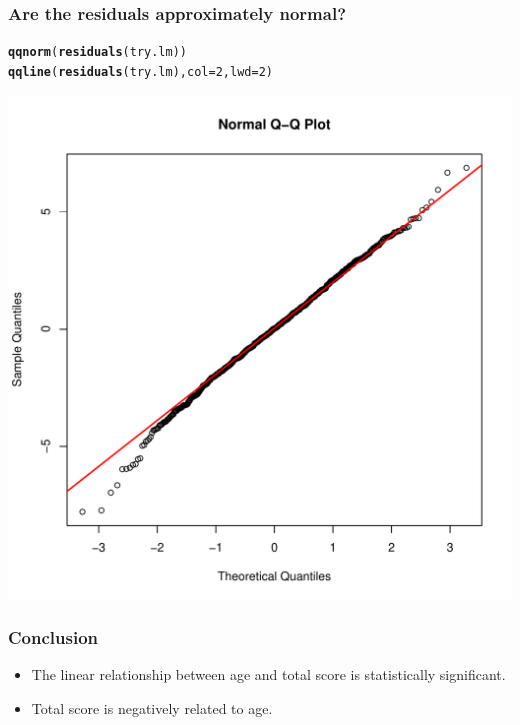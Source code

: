 \documentclass{beamer}\usepackage[]{graphicx}\usepackage[]{color}
\makeatletter
\newcommand{\hlnum}[1]{\textcolor[rgb]{0.686,0.059,0.569}{#1}}%
\newcommand{\hlstd}[1]{\textcolor[rgb]{0.345,0.345,0.345}{#1}}%
\newcommand{\hlkwc}[1]{\textcolor[rgb]{0.333,0.667,0.333}{#1}}%
\newcommand{\hlkwd}[1]{\textcolor[rgb]{0.737,0.353,0.396}{\textbf{#1}}}%
\newenvironment{kframe}{%
 \def\at@end@of@kframe{}%
 \ifinner\ifhmode%
  \def\at@end@of@kframe{\end{minipage}}%
  \begin{minipage}{\columnwidth}%
 \fi\fi%
 \def\FrameCommand##1{\hskip\@totalleftmargin \hskip-\fboxsep
 \colorbox{shadecolor}{##1}\hskip-\fboxsep
     \hskip-\linewidth \hskip-\@totalleftmargin \hskip\columnwidth}%
 \MakeFramed {\advance\hsize-\width
   \@totalleftmargin\z@ \linewidth\hsize
   \@setminipage}}%
 {\par\unskip\endMakeFramed%
 \at@end@of@kframe}
\newenvironment{knitrout}{}{} %
\makeatother
\begin{document}
\begin{frame}[fragile]
\frametitle{Are the residuals approximately normal?}
\begin{knitrout}
\color{fgcolor}\begin{kframe}
\begin{alltt}
\hlkwd{qqnorm}\hlstd{(}\hlkwd{residuals}\hlstd{(try.lm))}
\hlkwd{qqline}\hlstd{(}\hlkwd{residuals}\hlstd{(try.lm),} \hlkwc{col} \hlstd{=} \hlnum{2}\hlstd{,} \hlkwc{lwd} \hlstd{=} \hlnum{2}\hlstd{)}
\end{alltt}
\end{kframe}

{\centering \includegraphics[width=0.6\linewidth]{figure/unnamed-chunk-7-1} 

}



\end{knitrout}
\end{frame} 


\begin{frame}[fragile]
\frametitle{Conclusion}
\begin{itemize}
\item The linear relationship between age and total score is statistically significant.
\item Total score is negatively related to age.
\end{itemize}
\end{frame}
\end{document}
